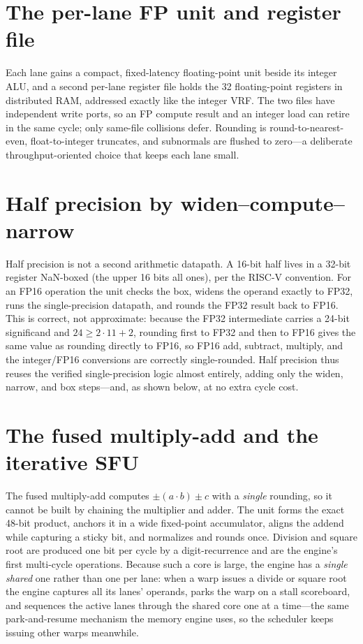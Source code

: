 \documentclass[12pt,a4paper,oneside]{report}
\begin{document}
\section{The per-lane FP unit and register file}
Each lane gains a compact, fixed-latency floating-point unit beside its integer
ALU, and a second per-lane register file holds the 32 floating-point registers in
distributed RAM, addressed exactly like the integer VRF. The two files have
independent write ports, so an FP compute result and an integer load can retire in
the same cycle; only same-file collisions defer. Rounding is round-to-nearest-even,
float-to-integer truncates, and subnormals are flushed to zero---a deliberate
throughput-oriented choice that keeps each lane small.

\section{Half precision by widen--compute--narrow}
Half precision is not a second arithmetic datapath. A 16-bit half lives in a
32-bit register NaN-boxed (the upper 16 bits all ones), per the RISC-V convention.
For an FP16 operation the unit checks the box, widens the operand exactly to FP32,
runs the single-precision datapath, and rounds the FP32 result back to FP16. This
is correct, not approximate: because the FP32 intermediate carries a 24-bit
significand and $24\ge 2\cdot 11 + 2$, rounding first to FP32 and then to FP16
gives the same value as rounding directly to FP16, so FP16 add, subtract,
multiply, and the integer/FP16 conversions are correctly single-rounded. Half
precision thus reuses the verified single-precision logic almost entirely, adding
only the widen, narrow, and box steps---and, as shown below, at no extra cycle
cost.

\section{The fused multiply-add and the iterative SFU}
The fused multiply-add computes $\pm(a\cdot b)\pm c$ with a \emph{single}
rounding, so it cannot be built by chaining the multiplier and adder. The unit
forms the exact 48-bit product, anchors it in a wide fixed-point accumulator,
aligns the addend while capturing a sticky bit, and normalizes and rounds once.
Division and square root are produced one bit per cycle by a digit-recurrence and
are the engine's first multi-cycle operations. Because such a core is large, the
engine has a \emph{single shared} one rather than one per lane: when a warp issues
a divide or square root the engine captures all its lanes' operands, parks the
warp on a stall scoreboard, and sequences the active lanes through the shared core
one at a time---the same park-and-resume mechanism the memory engine uses, so the
scheduler keeps issuing other warps meanwhile.
\end{document}
